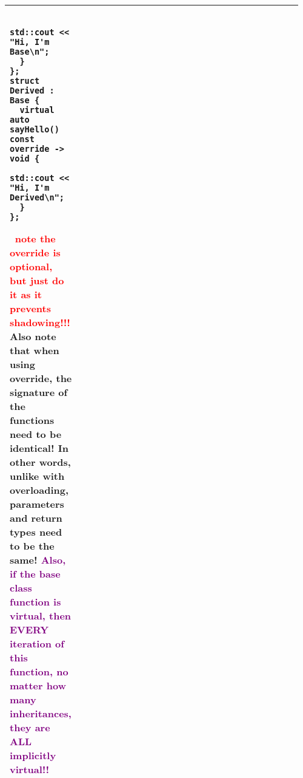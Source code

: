 \documentclass[main.tex,fontsize=8pt,paper=a4,paper=portrait,DIV=calc]{scrartcl}
\begin{document}
\begin{table}[ht!]
\begin{tabular}{|m{0.2\linewidth}|m{0.755\linewidth}|}
\begin{lstlisting}
    std::cout << "Hi, I'm Base\n";
  }
};
struct Derived : Base {
  virtual auto sayHello() const override -> void {
    std::cout << "Hi, I'm Derived\n";
  } 
};
\end{lstlisting}
\, \newline
\textcolor{red}{note the override is optional, but just do it as it prevents shadowing!!!}\newline
Also note that when using override, the signature of the functions need to be identical! In other words, unlike with overloading, parameters and return types need to be the same!\newline
\textcolor{purple}{Also, if the \textbf{base class function is virtual, then EVERY iteration of this function, no matter how many inheritances, they are ALL implicitly virtual!!}}
\\
\hline
\end{tabular}
\end{table}
\pagebreak
\end{document}
